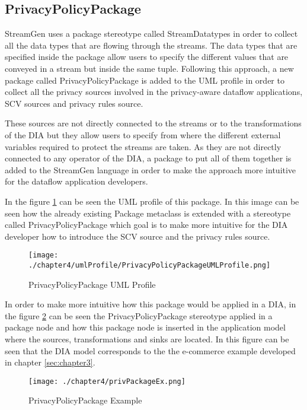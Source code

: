 \subsection{PrivacyPolicyPackage}

StreamGen uses a package stereotype called StreamDatatypes in order to collect all the data types that are flowing through the streams. The data types that are specified inside the package allow users to specify the different values that are conveyed in a stream but inside the same tuple. Following this approach, a new package called PrivacyPolicyPackage is added to the UML profile in order to collect all the privacy sources involved in the privacy-aware dataflow applications, SCV sources and privacy rules source.

These sources are not directly connected to the streams or to the transformations of the DIA but they allow users to specify from where the different external variables required to protect the streams are taken. As they are not directly connected to any operator of the DIA, a package to put all of them together is added to the StreamGen language in order to make the approach more intuitive for the dataflow application developers.

In the figure \ref{fig:PrivacyPolicyPackage UML Profile} can be seen the UML profile of this package. In this image can be seen how the already existing Package metaclass is extended with a stereotype called PrivacyPolicyPackage which goal is to make more intuitive for the DIA developer how to introduce the SCV source and the privacy rules source.

\begin{figure}
\centering
{\texttt{[image: ./chapter4/umlProfile/PrivacyPolicyPackageUMLProfile.png]}}
\caption{PrivacyPolicyPackage UML Profile}
\label{fig:PrivacyPolicyPackage UML Profile}
\end{figure}

In order to make more intuitive how this package would be applied in a DIA, in the figure \ref{fig:PrivacyPolicyPackage Example} can be seen the PrivacyPolicyPackage stereotype applied in a package node and how this package node is inserted in the application model where the sources, transformations and sinks are located. In this figure can be seen that the DIA model corresponds to the the e-commerce example developed in chapter \ref{sec:chapter3}.

\begin{figure}
\centering
{\texttt{[image: ./chapter4/privPackageEx.png]}}
\caption{PrivacyPolicyPackage Example}
\label{fig:PrivacyPolicyPackage Example}
\end{figure}


